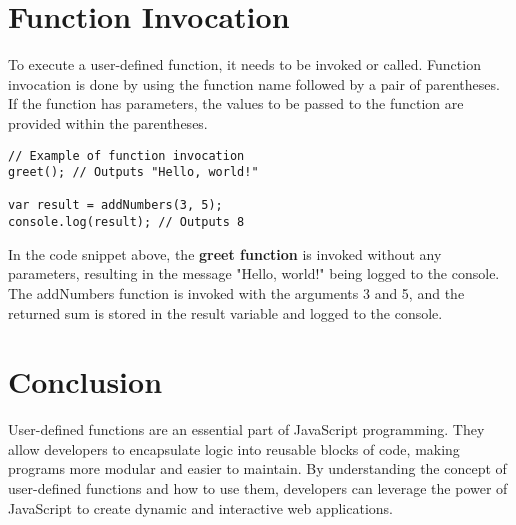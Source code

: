 \documentclass{article}
\begin{document}
\section{Function Invocation}
To execute a user-defined function, it needs to be invoked or called. Function invocation is done by using the function name followed by a pair of parentheses. If the function has parameters, the values to be passed to the function are provided within the parentheses.

\begin{lstlisting}
// Example of function invocation
greet(); // Outputs "Hello, world!"

var result = addNumbers(3, 5);
console.log(result); // Outputs 8
\end{lstlisting}

In the code snippet above, the \textbf{greet function} is invoked without any parameters, resulting in the message "Hello, world!" being logged to the console. The addNumbers function is invoked with the arguments 3 and 5, and the returned sum is stored in the result variable and logged to the console.

\section{Conclusion}

User-defined functions are an essential part of JavaScript programming. They allow developers to encapsulate logic into reusable blocks of code, making programs more modular and easier to maintain. By understanding the concept of user-defined functions and how to use them, developers can leverage the power of JavaScript to create dynamic and interactive web applications.
\end{document}
